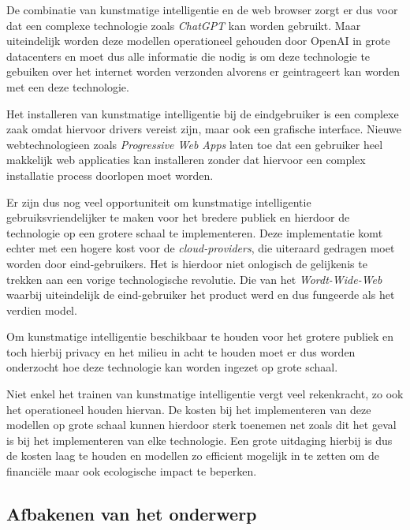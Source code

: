 \bigbreak{}

De combinatie van kunstmatige intelligentie en de web browser zorgt er dus voor dat een complexe technologie zoals \textit{ChatGPT} kan worden gebruikt. Maar uiteindelijk worden deze modellen operationeel gehouden door OpenAI in grote datacenters en moet dus alle informatie die nodig is om deze technologie te gebuiken over het internet worden verzonden alvorens er geintrageert kan worden met een deze technologie.

\bigbreak{}

Het installeren van kunstmatige intelligentie bij de eindgebruiker is een complexe zaak omdat hiervoor drivers vereist zijn, maar ook een grafische interface. Nieuwe webtechnologieen zoals \textit{Progressive Web Apps} laten toe dat een gebruiker heel makkelijk web applicaties kan installeren zonder dat hiervoor een complex installatie process doorlopen moet worden. 

\bigbreak{}

Er zijn dus nog veel opportuniteit om kunstmatige intelligentie gebruiksvriendelijker te maken voor het bredere publiek en hierdoor de technologie op een grotere schaal te implementeren. Deze implementatie komt echter met een hogere kost voor de \textit{cloud-providers}, die uiteraard gedragen moet worden door eind-gebruikers. Het is hierdoor niet onlogisch de gelijkenis te trekken aan een vorige technologische revolutie. Die van het \textit{Wordt-Wide-Web} waarbij uiteindelijk de eind-gebruiker het product werd en dus fungeerde als het verdien model.

\bigbreak{}

Om kunstmatige intelligentie beschikbaar te houden voor het grotere publiek en toch hierbij privacy en het milieu in acht te houden moet er dus worden onderzocht hoe deze technologie kan worden ingezet op grote schaal.

\bigbreak{}

Niet enkel het trainen van kunstmatige intelligentie vergt veel rekenkracht, zo ook het operationeel houden hiervan. De kosten bij het implementeren van deze modellen op grote schaal kunnen hierdoor sterk toenemen net zoals dit het geval is bij het implementeren van elke technologie. Een grote uitdaging hierbij is dus de kosten laag te houden en modellen zo efficient mogelijk in te zetten om de financiële maar ook ecologische impact te beperken.

\subsection{Afbakenen van het onderwerp} %

